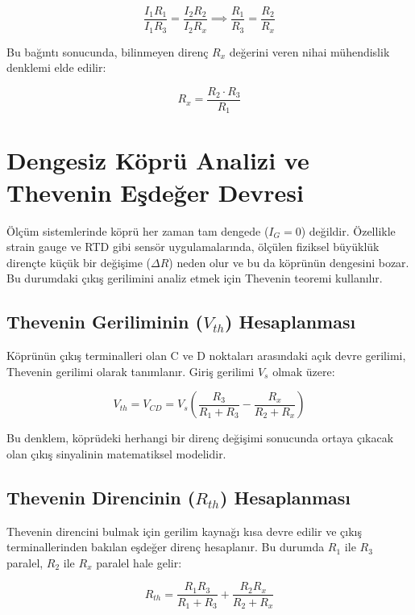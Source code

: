 \documentclass[12pt,a4paper]{article}
\begin{document}
\begin{equation}
    \frac{I_1 R_1}{I_1 R_3} = \frac{I_2 R_2}{I_2 R_x} \implies \frac{R_1}{R_3} = \frac{R_2}{R_x}
\end{equation}

Bu bağıntı sonucunda, bilinmeyen direnç $R_x$ değerini veren nihai mühendislik denklemi elde edilir:

\begin{equation}
    R_x = \frac{R_2 \cdot R_3}{R_1}
\end{equation}
\section{Dengesiz Köprü Analizi ve Thevenin Eşdeğer Devresi}
Ölçüm sistemlerinde köprü her zaman tam dengede ($I_G = 0$) değildir. Özellikle strain gauge ve RTD gibi sensör uygulamalarında, ölçülen fiziksel büyüklük dirençte küçük bir değişime ($\Delta R$) neden olur ve bu da köprünün dengesini bozar. Bu durumdaki çıkış gerilimini analiz etmek için Thevenin teoremi kullanılır.

\subsection{Thevenin Geriliminin ($V_{th}$) Hesaplanması}
Köprünün çıkış terminalleri olan C ve D noktaları arasındaki açık devre gerilimi, Thevenin gerilimi olarak tanımlanır. Giriş gerilimi $V_s$ olmak üzere:

\begin{equation}
    V_{th} = V_{CD} = V_s \left( \frac{R_3}{R_1 + R_3} - \frac{R_x}{R_2 + R_x} \right)
\end{equation}

Bu denklem, köprüdeki herhangi bir direnç değişimi sonucunda ortaya çıkacak olan çıkış sinyalinin matematiksel modelidir.

\subsection{Thevenin Direncinin ($R_{th}$) Hesaplanması}
Thevenin direncini bulmak için gerilim kaynağı kısa devre edilir ve çıkış terminallerinden bakılan eşdeğer direnç hesaplanır. Bu durumda $R_1$ ile $R_3$ paralel, $R_2$ ile $R_x$ paralel hale gelir:

\begin{equation}
    R_{th} = \frac{R_1 R_3}{R_1 + R_3} + \frac{R_2 R_x}{R_2 + R_x}
\end{equation}
\end{document}
